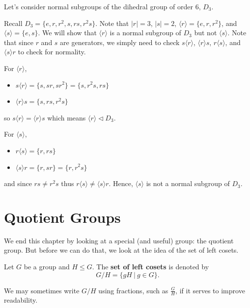 \begin{example}\label{example-normal-subgroups-of-d3}
    Let's consider normal subgroups of the dihedral group of order 6, $D_3$.

    Recall $D_3 = \{e, r, r^2, s, rs, r^2s\}$. Note that $|r| = 3$, $|s| = 2$, $\langle r \rangle = \{e, r, r^2\}$, and $\langle s \rangle = \{e, s\}$. We will show that $\langle r \rangle$ is a normal subgroup of $D_3$ but not $\langle s \rangle$. Note that since $r$ and $s$ are generators, we simply need to check $s\langle r\rangle$, $\langle r\rangle s$, $r\langle s\rangle$, and $\langle s\rangle r$ to check for normality.

    For $\langle r \rangle$,
    \begin{itemize}
        \item $s\langle r\rangle = \{s, sr, sr^2\} = \{s, r^2s, rs\}$
        \item $\langle r\rangle s = \{s, rs, r^2s\}$
    \end{itemize}
    so $s\langle r\rangle = \langle r \rangle s$ which means $\langle r \rangle \lhd D_3$.

    For $\langle s \rangle$,
    \begin{itemize}
        \item $r\langle s\rangle = \{r, rs\}$
        \item $\langle s \rangle r = \{r, sr\} = \{r, r^2s\}$
    \end{itemize}
    and since $rs \neq r^2s$ thus $r\langle s\rangle \neq \langle s \rangle r$. Hence, $\langle s \rangle$ is not a normal subgroup of $D_3$.
\end{example}

\section{Quotient Groups}
We end this chapter by looking at a special (and useful) group: the quotient group. But before we can do that, we look at the idea of the set of left cosets.

\begin{definition}
    Let $G$ be a group and $H \leq G$. The \textbf{set of left cosets} is denoted by
    \[
        G/H = \{gH \ | \ g \in G \}.
    \]
\end{definition}
\begin{remark}
    We may sometimes write $G/H$ using fractions, such as $\frac GH$, if it serves to improve readability.
\end{remark}

